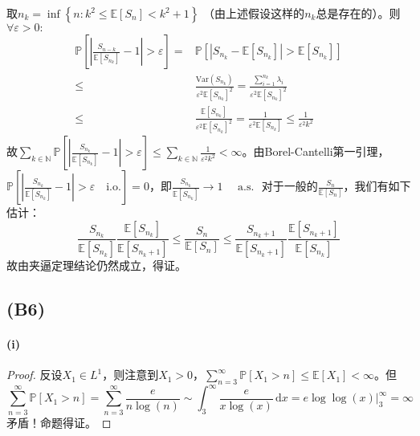 \documentclass{ctexart}
\begin{document}
取$n_k=\inf \left\{ n:k^2\leq \underset{}{\mathbb{E}}\left[ S_n\right]<k^2+1  \right\}$ （由上述假设这样的$n_k$总是存在的）。则$\forall\varepsilon>0:$
\begin{align*}
  \mathbb{P}\left[ \left| \frac{S_{n-k}}{\underset{}{\mathbb{E}}\left[ S_{n_k}\right] } -1\right| >\varepsilon\right]=&\mathbb{P}\left[ |S_{n_k}-\underset{}{\mathbb{E}}\left[ S_{n_k}\right] | >\underset{}{\mathbb{E}}\left[ S_{n_k}\right] \right]\\
  \leq & \frac{\mathrm{Var}(S_{n_k})}{\varepsilon^2 \underset{}{\mathbb{E}}\left[ S_{n_k}\right]^2 }=\frac{\sum\limits_{i=1}^{n_k}\lambda_i}{\varepsilon^2 \underset{}{\mathbb{E}}\left[ S_{n_k}\right]^2 }\\
  \leq & \frac{\underset{}{\mathbb{E}}\left[ S_{n_k}\right] }{\varepsilon^2 \underset{}{\mathbb{E}}\left[ S_{n_k}\right]^2 }= \frac{1}{\varepsilon^2 \underset{}{\mathbb{E}}\left[ S_{n_{k}}\right] }\leq \frac{1}{\varepsilon^2 k^2}
\end{align*}
故$\sum\limits_{k\in \mathbb{N}}^{}\mathbb{P}\left[  \left| \frac{S_{n_k}}{\underset{}{\mathbb{E}}\left[ S_{n_k}\right] } -1\right| >\varepsilon\right]\leq \sum\limits_{k\in \mathbb{N}}^{}\frac{1}{\varepsilon^2k^2}<\infty $。由Borel-Cantelli第一引理，$\mathbb{P}\left[ \left| \frac{S_{n_k}}{\underset{}{\mathbb{E}}\left[ S_{n_k}\right] }-1 \right|>\varepsilon \quad \mathrm{i.o.} \right]=0$，即$\frac{S_{n_k}}{\underset{}{\mathbb{E}}\left[ S_{n_k}\right] }\to 1 \quad \text{ a.s. }$
对于一般的$\frac{S_n}{\underset{}{\mathbb{E}}\left[ S_n\right] }$，我们有如下估计：
\begin{equation*}
\frac{S_{n_k}}{\underset{}{\mathbb{E}}\left[ S_{n_k}\right] } \frac{\underset{}{\mathbb{E}}\left[ S_{n_k}\right] }{\underset{}{\mathbb{E}}\left[ S_{n_k+1}\right] } \leq\frac{S_n}{\underset{}{\mathbb{E}}\left[ S_n\right] }\leq \frac{S_{n_k+1}}{\underset{}{\mathbb{E}}\left[ S_{n_k+1}\right] }\frac{\underset{}{\mathbb{E}}\left[ S_{n_k+1}\right] }{\underset{}{\mathbb{E}}\left[ S_{n_{k}}\right] }
\end{equation*}
故由夹逼定理结论仍然成立，得证。

\subsection{(B6)}
\paragraph{(i)}
\begin{proof}
  反设$X_1\in L^1$，则注意到$X_1>0$，$\sum\limits_{n=3}^{\infty}\mathbb{P}\left[ X_1> n \right]\leq \underset{}{\mathbb{E}}\left[ X_1\right]<\infty $。但
  \[\sum\limits_{n=3}^{\infty}\mathbb{P}\left[ X_1>n \right]=\sum\limits_{n=3}^{\infty}\frac{e}{n\log(n)}\sim \int_{3}^{\infty} \frac{e}{x\log(x)} \,\mathrm{d}x =\left.e\log\log(x)\right|_3^{\infty}=\infty\]
  矛盾！命题得证。
\end{proof}
\end{document}
